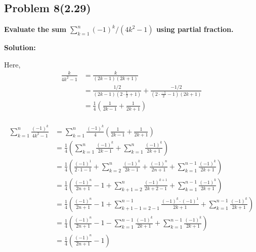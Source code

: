 \subsection{Problem 8(2.29)}
\textbf{Evaluate the sum $ \sum_{k=1}^{n} (-1)^k/(4k^2-1)$ using partial fraction.}
\par

\begin{flushleft}
\textbf{Solution: }
\par
Here,
$$
\begin{aligned}
    \frac{k}{4k^2-1} & = \frac{k}{(2k-1)(2k+1)} \\
    & = \frac{1/2}{(2k-1)(2\cdot \frac{1}{2} + 1)} + \frac{-1/2}{(2\cdot \frac{-1}{2} - 1)(2k+1)} \\
    & = \frac{1}{4} \left(  \frac{1}{2k-1} + \frac{1}{2k+1} \right)  \\
\end{aligned}
$$

$$
\begin{aligned}
    \sum_{k=1}^{n} \frac{(-1)^k}{4k^2-1} & = \sum_{k=1}^{n} \frac{(-1)^k}{4} \left(  \frac{1}{2k-1} + \frac{1}{2k+1} \right) \\
    & = \frac{1}{4} \left( \sum_{k=1}^{n} \frac{(-1)^k}{2k-1} + \sum_{k=1}^{n} \frac{(-1)^{k}}{2k+1} \right) \\
    & = \frac{1}{4} \left( \frac{(-1)^1}{2\cdot1-1} + \sum_{k=2}^{n} \frac{(-1)^k}{2k-1} +  \frac{(-1)^n}{2n+1} + \sum_{k=1}^{n-1} \frac{(-1)^{k}}{2k+1} \right) \\
    & = \frac{1}{4} \left( \frac{(-1)^n}{2n+1} - 1 +  \sum_{k+1=2}^{n} \frac{(-1)^{k+1}}{2k+2-1} + \sum_{k=1}^{n-1} \frac{(-1)^{k}}{2k+1} \right) \\
    & = \frac{1}{4} \left( \frac{(-1)^n}{2n+1} - 1 +  \sum_{k+1-1=2-1}^{n-1} \frac{(-1)^{k} \cdot (-1)^1}{2k+1}  + \sum_{k=1}^{n-1} \frac{(-1)^{k}}{2k+1} \right) \\
    & = \frac{1}{4} \left( \frac{(-1)^n}{2n+1} - 1 -  \sum_{k=1}^{n-1} \frac{(-1)^{k}}{2k+1}  + \sum_{k=1}^{n-1} \frac{(-1)^{k}}{2k+1} \right) \\
    & = \frac{1}{4} \left( \frac{(-1)^n}{2n+1} - 1 \right) \\
\end{aligned}
$$

\end{flushleft}